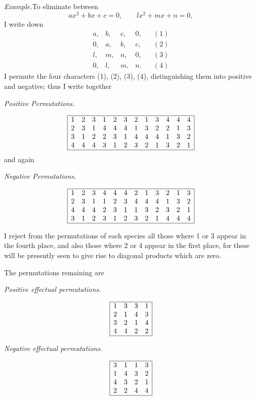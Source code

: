 \documentclass[11pt]{article}
\newcommand{\sourcepage}[1]{\marginpar{\scriptsize p.~#1}}
\begin{document}
\emph{Example.}\quad To eliminate between
\[
 ax^2+bx+c=0,
\qquad
 lx^2+mx+n=0,
\]
I write down
\[
\begin{array}{cccccc}
 a,&b,&c,&0,&&(1)\\
 0,&a,&b,&c,&&(2)\\
 l,&m,&n,&0,&&(3)\\
 0,&l,&m,&n.&&(4)
\end{array}
\]
I permute the four characters (1), (2), (3), (4), distinguishing them into positive and negative; thus I write together

\begin{center}\itshape Positive Permutations.\end{center}
\[
\begin{array}{|cccccccccccc|}
\hline
1&2&3&1&2&3&2&1&3&4&4&4\\
2&3&1&4&4&4&1&3&2&2&1&3\\
3&1&2&2&3&1&4&4&4&1&3&2\\
4&4&4&3&1&2&3&2&1&3&2&1\\
\hline
\end{array}
\]
and again

\begin{center}\itshape Negative Permutations.\end{center}
\[
\begin{array}{|cccccccccccc|}
\hline
1&2&3&4&4&4&2&1&3&2&1&3\\
2&3&1&1&2&3&4&4&4&1&3&2\\
4&4&4&2&3&1&1&3&2&3&2&1\\
3&1&2&3&1&2&3&2&1&4&4&4\\
\hline
\end{array}
\]

\sourcepage{56}
I reject from the permutations of each species all those where 1 or 3 appear in the fourth place, and also those where 2 or 4 appear in the first place, for these will be presently seen to give rise to diagonal products which are zero.

The permutations remaining are

\begin{center}\itshape Positive effectual permutations.\end{center}
\[
\begin{array}{|cccc|}
\hline
1&3&3&1\\
2&1&4&3\\
3&2&1&4\\
4&4&2&2\\
\hline
\end{array}
\]
\begin{center}\itshape Negative effectual permutations.\end{center}
\[
\begin{array}{|cccc|}
\hline
3&1&1&3\\
1&4&3&2\\
4&3&2&1\\
2&2&4&4\\
\hline
\end{array}
\]
\end{document}
